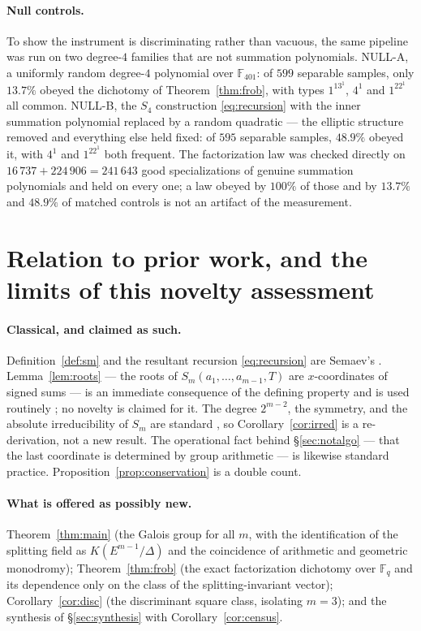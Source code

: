\documentclass[11pt,a4paper]{article}
\theoremstyle{plain}
\theoremstyle{definition}
\newcommand{\FF}{\mathbb{F}}
\newcommand{\Fq}{\FF_q}
\begin{document}
\paragraph{Null controls.}
To show the instrument is discriminating rather than vacuous, the same pipeline
was run on two degree-$4$ families that are not summation polynomials.
NULL-A, a uniformly random degree-$4$ polynomial over $\FF_{401}$: of $599$
separable samples, only $13.7\%$ obeyed the dichotomy of
Theorem~\ref{thm:frob}, with types $1^13^1$, $4^1$ and $1^22^1$ all common.
NULL-B, the $S_4$ construction \eqref{eq:recursion} with the inner summation
polynomial replaced by a random quadratic --- the elliptic structure removed and
everything else held fixed: of $595$ separable samples, $48.9\%$ obeyed it, with
$4^1$ and $1^22^1$ both frequent. The factorization law was checked directly on
$16\,737 + 224\,906 = 241\,643$ good specializations of genuine summation
polynomials and held on every one; a law obeyed by $100\%$ of those and by
$13.7\%$ and $48.9\%$ of matched controls is not an artifact of the measurement.

\section{Relation to prior work, and the limits of this novelty assessment}
\label{sec:novelty}

\paragraph{Classical, and claimed as such.}
Definition~\ref{def:sm} and the resultant recursion \eqref{eq:recursion} are
Semaev's \cite{semaev2004}. Lemma~\ref{lem:roots} --- the roots of
$S_m(a_1,\dots,a_{m-1},T)$ are $x$-coordinates of signed sums --- is an immediate
consequence of the defining property and is used routinely
\cite{gaudry2009,fghr2014,ky2015}; no novelty is claimed for it. The degree
$2^{m-2}$, the symmetry, and the absolute irreducibility of $S_m$ are standard
\cite{semaev2004,gaudry2009}, so Corollary~\ref{cor:irred} is a re-derivation, not
a new result. The operational fact behind \S\ref{sec:notalgo} --- that the last
coordinate is determined by group arithmetic --- is likewise standard practice.
Proposition~\ref{prop:conservation} is a double count.

\paragraph{What is offered as possibly new.}
Theorem~\ref{thm:main} (the Galois group for all $m$, with the identification of
the splitting field as $K(E^{m-1}/\Delta)$ and the coincidence of arithmetic and
geometric monodromy); Theorem~\ref{thm:frob} (the exact factorization dichotomy
over $\Fq$ and its dependence only on the class of the splitting-invariant
vector); Corollary~\ref{cor:disc} (the discriminant square class, isolating
$m=3$); and the synthesis of \S\ref{sec:synthesis} with
Corollary~\ref{cor:census}.
\end{document}
